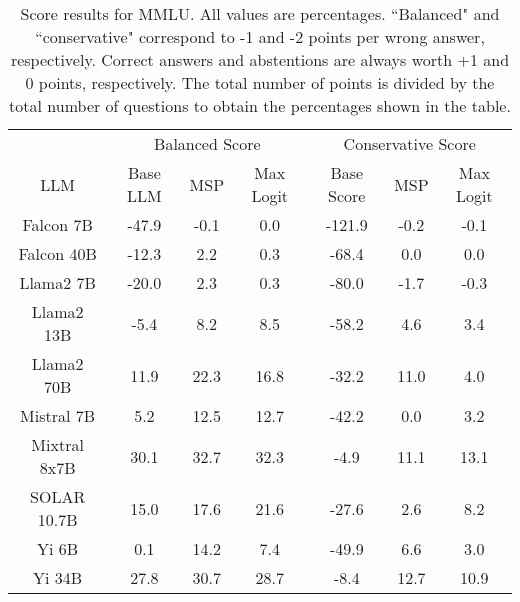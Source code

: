 \renewcommand\arraystretch{1.2}
\begin{table*}
\centering
\begin{tabular}{c|c|c|c|c|c|c}
& \multicolumn{3}{c|}{Balanced Score} & \multicolumn{3}{c}{Conservative Score} \\ 
LLM & Base LLM & MSP & Max Logit & Base Score & MSP & Max Logit\\ \hline
Falcon 7B & -47.9 & -0.1 & 0.0 & -121.9 & -0.2 & -0.1\\
Falcon 40B & -12.3 & 2.2 & 0.3 & -68.4 & 0.0 & 0.0\\
Llama2 7B & -20.0 & 2.3 & 0.3 & -80.0 & -1.7 & -0.3\\
Llama2 13B & -5.4 & 8.2 & 8.5 & -58.2 & 4.6 & 3.4\\
Llama2 70B & 11.9 & 22.3 & 16.8 & -32.2 & 11.0 & 4.0\\
Mistral 7B & 5.2 & 12.5 & 12.7 & -42.2 & 0.0 & 3.2\\
Mixtral 8x7B & 30.1 & 32.7 & 32.3 & -4.9 & 11.1 & 13.1\\
SOLAR 10.7B & 15.0 & 17.6 & 21.6 & -27.6 & 2.6 & 8.2\\
Yi 6B & 0.1 & 14.2 & 7.4 & -49.9 & 6.6 & 3.0\\
Yi 34B & 27.8 & 30.7 & 28.7 & -8.4 & 12.7 & 10.9\\
\hline
\end{tabular}
\caption{Score results for MMLU. All values are percentages. ``Balanced" and ``conservative" correspond to -1 and -2 points per wrong answer, respectively. Correct answers and abstentions are always worth +1 and 0 points, respectively. The total number of points is divided by the total number of questions to obtain the percentages shown in the table.}
\label{tab:mmlu_score}
\end{table*}

